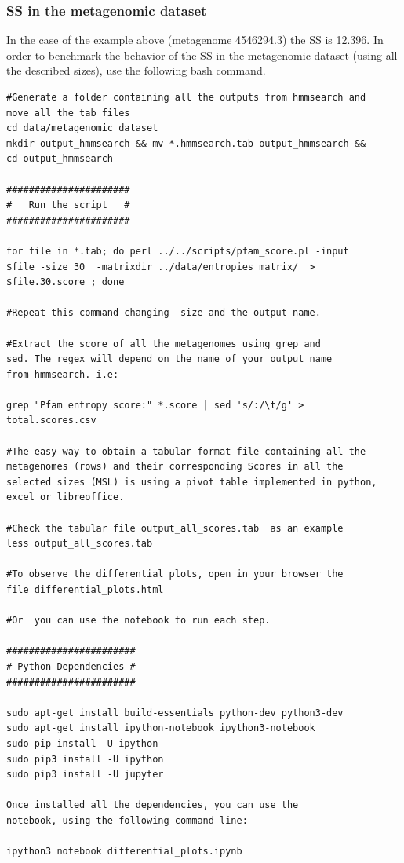 \documentclass[12pt]{report}
\begin{document}
\subsubsection{SS in the metagenomic dataset}

In the case of the example above (metagenome 4546294.3) the SS is 12.396. In
order to benchmark the behavior of the SS in the metagenomic dataset (using all
the described sizes), use the following bash command. 

\begin{verbatim}
#Generate a folder containing all the outputs from hmmsearch and 
move all the tab files  
cd data/metagenomic_dataset
mkdir output_hmmsearch && mv *.hmmsearch.tab output_hmmsearch && 
cd output_hmmsearch 

######################
#   Run the script   #
######################

for file in *.tab; do perl ../../scripts/pfam_score.pl -input 
$file -size 30  -matrixdir ../data/entropies_matrix/  > 
$file.30.score ; done 

#Repeat this command changing -size and the output name. 

#Extract the score of all the metagenomes using grep and 
sed. The regex will depend on the name of your output name 
from hmmsearch. i.e:

grep "Pfam entropy score:" *.score | sed 's/:/\t/g' > 
total.scores.csv 

#The easy way to obtain a tabular format file containing all the 
metagenomes (rows) and their corresponding Scores in all the 
selected sizes (MSL) is using a pivot table implemented in python, excel or libreoffice.

#Check the tabular file output_all_scores.tab  as an example 
less output_all_scores.tab

#To observe the differential plots, open in your browser the 
file differential_plots.html

#Or  you can use the notebook to run each step.

#######################
# Python Dependencies #
#######################

sudo apt-get install build-essentials python-dev python3-dev
sudo apt-get install ipython-notebook ipython3-notebook
sudo pip install -U ipython
sudo pip3 install -U ipython
sudo pip3 install -U jupyter

Once installed all the dependencies, you can use the 
notebook, using the following command line:

ipython3 notebook differential_plots.ipynb

\end{verbatim}
\end{document}

